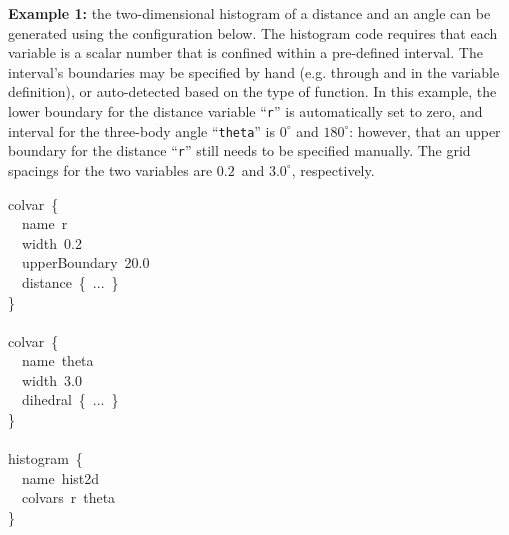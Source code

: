 \noindent\textbf{Example 1:} the two-dimensional histogram of a distance and an angle can be generated using the configuration below.  The histogram code requires that each variable is a scalar number that is confined within a pre-defined interval.  The interval's boundaries may be specified by hand (e.g.{} through  and  in the variable definition), or auto-detected based on the type of function.  In this example, the lower boundary for the distance variable ``\texttt{r}'' is automatically set to zero, and interval for the three-body angle ``\texttt{theta}'' is $0^\circ$ and $180^\circ$: however, that an upper boundary for the distance ``\texttt{r}'' still needs to be specified manually.  The grid spacings for the two variables are $0.2$~\lengthunit and $3.0^\circ$, respectively.
\begin{cvexampleinput}
\-colvar~\{\\
\-\-~~name~r\\
\-\-~~width~0.2\\
\-\-~~upperBoundary~20.0\\
\-\-~~distance~\{~...~\}\\
\-\}\\
\\
\-colvar~\{\\
\-\-~~name~theta\\
\-\-~~width~3.0\\
\-\-~~dihedral~\{~...~\}\\
\-\}\\
\\
\-histogram~\{\\
\-\-~~name~hist2d\\
\-\-~~colvars~r~theta\\
\-\}\\
\end{cvexampleinput}

